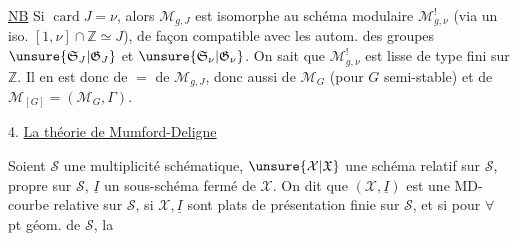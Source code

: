 \uline{NB} Si $\operatorname{card}J=\nu$, alors $\mathcal M_{g,J}$ est isomorphe au schéma modulaire $\mathcal M^!_{g,\nu}$ (via un iso. $[1,\nu]\cap\mathbb Z\simeq J$), de façon compatible avec les autom. des groupes $\unsure{\mathfrak S_J|\mathfrak G_J}$ et $\unsure{\mathfrak S_\nu|\mathfrak G_\nu}$. On sait que $\mathcal M^!_{g,\nu}$ est lisse de type fini sur $\mathbb Z$. Il en est donc de $=$ de $\mathcal M_{g,J}$, donc aussi de $\mathcal M_G$ (pour $G$ semi-stable) et de $\mathcal M_{[G]}=(\mathcal M_G,\Gamma)$.

4. \uline{La théorie de Mumford-Deligne}

Soient $\mathcal S$ une multiplicité schématique, $\unsure{\mathcal X|\mathfrak X}$ une  schéma relatif sur $\mathcal S$, propre sur $\mathcal S$, $\underline I$ un sous-schéma fermé de $\mathcal X$. On dit que $(\mathcal X,\underline I)$ est une MD-courbe relative sur $\mathcal S$, si $\mathcal X,\underline I$ sont plats de présentation finie sur $\mathcal S$, et si pour $\forall$ pt géom. de $\mathcal S$, la
